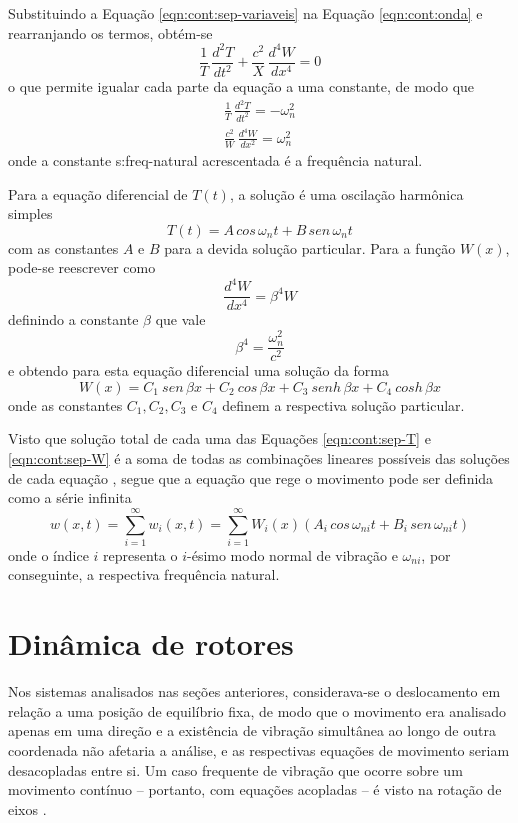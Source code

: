 \documentclass[12pt,openright,oneside,a4paper,
	chapter=TITLE,section=TITLE,
	english,brazil]{abntex2}
\begin{document}
	Substituindo a Equação \ref{eqn:cont:sep-variaveis} na Equação \ref{eqn:cont:onda} e rearranjando os termos, obtém-se
	\begin{equation} \label{eqn:cont:geral-vigas}
		\frac{1}{T}\,\frac{d^2T}{dt^2} + \frac{\mathit{c}^2}{X}\,\frac{d^4W}{dx^4} = 0
	\end{equation}
	o que permite \cite{clark:1972} igualar cada parte da equação a uma constante, de modo que
	\begin{align*}
		\frac{1}{T}\,\frac{d^2T}{dt^2} = -\omega_n^2 \\
		\frac{\mathit{c}^2}{W}\,\frac{d^4W}{dx^2} = \omega_n^2
	\end{align*}
	onde a constante \gls{s:freq-natural} acrescentada é a frequência natural. 
	
	Para a equação diferencial de $T(t)$, a solução é uma oscilação harmônica simples 
	\begin{equation} \label{eqn:cont:sep-T}
		T(t) = \mathit{A}\,cos\,\omega_n t + \mathit{B}\,sen\,\omega_n t
	\end{equation}
	com as constantes $ A $ e $ B $ para a devida solução particular. Para a função $W(x)$, pode-se reescrever como \[\frac{d^4W}{dx^4} = \beta^4W \] definindo a constante $\beta$ que vale \[\beta^4 = \frac{\omega_n^2}{\mathit{c}^2} \] e obtendo para esta equação diferencial uma solução da forma
	\begin{equation} \label{eqn:cont:sep-W}
		W(x) = C_1\:sen\,\beta x + C_2\:cos\,\beta x + C_3\:senh\,\beta x + C_4\:cosh\,\beta x
	\end{equation}
	onde as constantes $ C_1, C_2, C_3 $ e $ C_4 $ definem a respectiva solução particular.
	
	Visto que solução total de cada uma das Equações \ref{eqn:cont:sep-T} e \ref{eqn:cont:sep-W} é a soma de todas as combinações lineares possíveis das soluções de cada equação \cite{boyce:2017}, segue que a equação que rege o movimento pode ser definida como a série infinita \cite{clark:1972}
	\begin{equation}
		w(x,t) = \sum_{i=1}^{\infty}w_i(x,t) = \sum_{i=1}^{\infty}W_i(x)(\mathit{A}_i\,cos\,\omega_{ni} t + \mathit{B}_i\,sen\,\omega_{ni} t)
	\end{equation}
	onde o índice $i$ representa o $i$-ésimo modo normal de vibração e $ \omega_{ni} $, por conseguinte, a respectiva frequência natural.
	
	\section{Dinâmica de rotores}
	Nos sistemas analisados nas seções anteriores, considerava-se o deslocamento em relação a uma posição de equilíbrio fixa, de modo que o movimento era analisado apenas em uma direção e a existência de vibração simultânea ao longo de outra coordenada não afetaria a análise, e as respectivas equações de movimento seriam desacopladas entre si. Um caso frequente de vibração que ocorre sobre um movimento contínuo -- portanto, com equações acopladas -- é visto na rotação de eixos \cite{dimarogonas:1995}.
\end{document}
